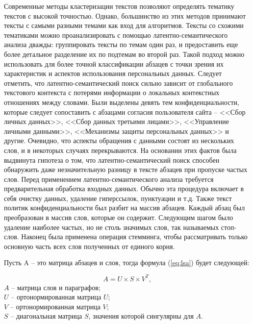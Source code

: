 \documentclass[../main]{subfiles}
\begin{document}
Современные методы кластеризации текстов позволяют определять тематику текстов с высокой точностью. Однако, большинство из этих методов принимают тексты с самыми разными темами как вход для алгоритмов. Тексты со схожими тематиками можно проанализировать с помощью ла\-тен\-тно-семантического анализа дважды: группировать тексты по темам один раз, и предоставить еще более детальное разделение их по подтемам во второй раз. Такой подход можно использовать для более точной классификации абзацев с точки зрения их характеристик и аспектов использования персональных данных. Следует отметить, что латентно-семантический поиск сильно зависит от глобального текстового контекста с потерями информации о локальных контекстных отношениях между словами. Были выделены девять тем конфиденциальности, которые следует сопоставить с абзацами согласия пользователя сайта -- <<Сбор личных данных>>, <<Сбор данных третьими лицами>>, <<Управление личными данными>>, <<Механизмы защиты персональных данных>> и другие. Очевидно, что аспекты обращения с данными состоят из нескольких слов, и в некоторых случаях перекрываются. На основании этих фактов была выдвинута гипотеза о том, что латентно-семантический поиск способен обнаружить даже незначительную разницу в тексте абзацев при пропуске частых слов. Перед применением латентно-семантического анализа требуется предварительная обработка входных данных. Обычно эта процедура включает в себя очистку данных, удаление гиперссылок, пунктуации и т.д. Также текст политик конфиденциальности был разбит на массив абзацев. Каждый абзац был преобразован в массив слов, которые он содержит. Следующим шагом было удаление наиболее частых, но не столь значимых слов, так называемых стоп-слов. Наконец была применена операция стемминга, чтобы рассматривать только основную часть всех слов полученных от единого корня.

Пусть A -- это матрица абзацев и слов, тогда формула (\ref{eq:lsa}) будет следующей:

\newpage
\begin{equation}
    \label{eq:lsa}
    A = U \times S \times V^T,
\end{equation}
$A$ -- матрица слов и параграфов;\\
\makebox[1.25cm]{\hfill}$U$ -- ортонормированная матрица $U$;\\
\makebox[1.25cm]{\hfill}$V$ -- ортонормированная матрица $V$;\\
\makebox[1.25cm]{\hfill}$S$ -- диагональная матрица $S$, значения которой сингулярны для $A$.
\end{document}
